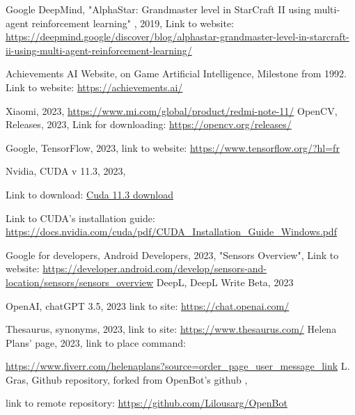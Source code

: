 \documentclass[12pt]{report}
\begin{document}
\begin{thebibliography}{99}
Google DeepMind,
"AlphaStar: Grandmaster level in StarCraft II using multi-agent reinforcement learning" , 2019, Link to website: \href{https://deepmind.google/discover/blog/alphastar-grandmaster-level-in-starcraft-ii-using-multi-agent-reinforcement-learning/}{https://deepmind.google/discover/blog/alphastar-grandmaster-level-in-starcraft-ii-using-multi-agent-reinforcement-learning/}

Achievements AI Website, on Game Artificial Intelligence, Milestone from 1992.
Link to website: \href{https://achievements.ai/}{https://achievements.ai/}

Xiaomi, 2023, \href{https://www.mi.com/global/product/redmi-note-11/}{https://www.mi.com/global/product/redmi-note-11/}
OpenCV, Releases, 2023, Link for downloading: \href{https://opencv.org/releases/}{https://opencv.org/releases/}

Google, TensorFlow, 2023,
link to website: \href{https://www.tensorflow.org/?hl=fr}{https://www.tensorflow.org/?hl=fr}

Nvidia, CUDA v 11.3, 2023,

Link to download: \href{https://developer.nvidia.com/cuda-11.3.0-download-archive?target_os=Linux&target_arch=x86_64&Distribution=Ubuntu&target_version=20.04&target_type=deb_network}{Cuda 11.3 download}

Link to CUDA's installation guide: \href{https://docs.nvidia.com/cuda/pdf/CUDA_Installation_Guide_Windows.pdf}{https://docs.nvidia.com/cuda/pdf/CUDA\_Installation\_Guide\_Windows.pdf}

Google for developers, Android Developers, 2023, 
"Sensors Overview",
Link to website: \href{https://developer.android.com/develop/sensors-and-location/sensors/sensors_overview}{https://developer.android.com/develop/sensors-and-location/sensors/sensors\_overview}
DeepL, DeepL Write Beta, 2023

OpenAI, chatGPT 3.5, 2023
link to site: \href{https://chat.openai.com/}{https://chat.openai.com/}

Thesaurus, synonyms, 2023,
link to site: \href{https://www.thesaurus.com/}{https://www.thesaurus.com/}
Helena Plans' page, 2023,
link to place command:

\href{https://www.fiverr.com/helenaplans?source=order_page_user_message_link}{https://www.fiverr.com/helenaplans?source=order\_page\_user\_message\_link}
L. Gras, Github repository, forked from OpenBot's github \cite{bib:git_openbot},

link to remote repository: \href{https://github.com/Lilousarg/OpenBot}{https://github.com/Lilousarg/OpenBot}
\end{thebibliography}
\end{document}
